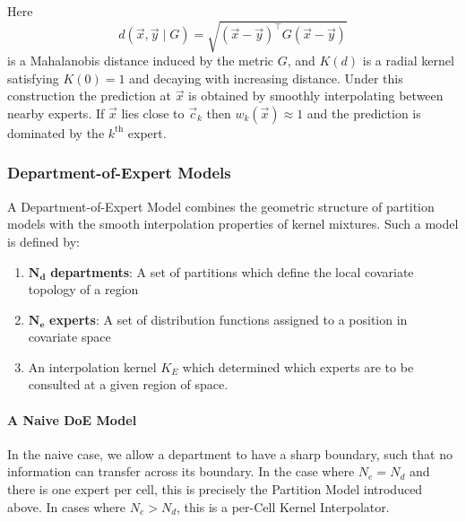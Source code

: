\begin{description}
			      Here
			      \begin{equation}
				      d(\vec{x},\vec{y}\mid G)
				      =
				      \sqrt{(\vec{x}-\vec{y})^\intercal G (\vec{x}-\vec{y})}
			      \end{equation}
			      is a Mahalanobis distance induced by the metric $G$, and $K(d)$ is a radial kernel satisfying $K(0)=1$ and decaying with increasing distance.
			      Under this construction the prediction at $\vec{x}$ is obtained by smoothly interpolating between nearby experts.
			      If $\vec{x}$ lies close to $\vec{c}_k$ then $w_k(\vec{x}) \approx 1$ and the prediction is dominated by the $k^{\text{th}}$ expert.
		\end{description}




	\subsubsection{Department-of-Expert Models}

		A Department-of-Expert Model combines the geometric structure of partition models with the smooth interpolation properties of kernel mixtures. Such a model is defined by:

		\begin{enumerate}
			\item $\mathbf{N_d}$ \textbf{departments}: A set of partitions which define the local covariate topology of a region
			\item $\mathbf{N_e}$ \textbf{experts}:  A set of distribution functions assigned to a position in covariate space
			\item An interpolation kernel $K_E$ which determined which experts are to be consulted at a given region of space.
		\end{enumerate}


		\paragraph{A Naive DoE Model} In the naive case, we allow a department to have a sharp boundary, such that no information can transfer across its boundary. In the case where $N_e = N_d$ and there is one expert per cell, this is precisely the Partition Model introduced above. In cases where $N_e > N_d$, this is a per-Cell Kernel Interpolator.

